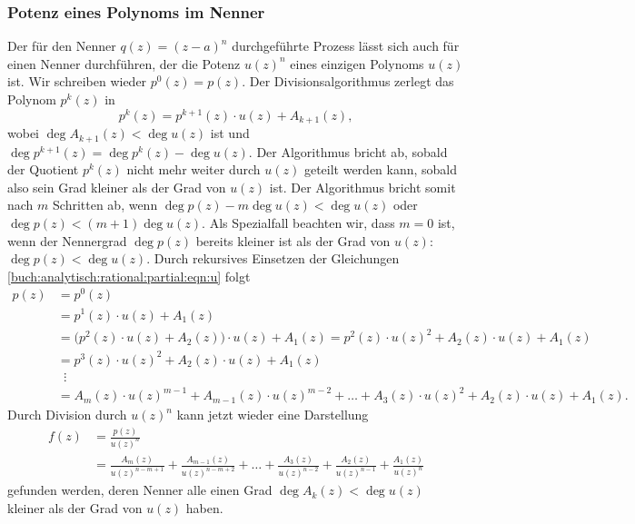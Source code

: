 %
%
\subsubsection{Potenz eines Polynoms im Nenner}
Der für den Nenner $q(z) = (z-a)^n$ durchgeführte Prozess lässt sich
auch für einen Nenner durchführen, der die Potenz $u(z)^n$ eines
einzigen Polynoms $u(z)$ ist.
Wir schreiben wieder $p^0(z)=p(z)$.
Der Divisionsalgorithmus zerlegt das Polynom $p^k(z)$ in 
\begin{equation}
p^k(z)
=
p^{k+1}(z)\cdot u(z) + A_{k+1}(z),
\label{buch:analytisch:rational:partial:eqn:u}
\end{equation}
wobei $\deg A_{k+1}(z)<\deg u(z)$ ist und
$\deg p^{k+1}(z) = \deg p^{k}(z)-\deg u(z)$.
Der Algorithmus bricht ab, sobald der Quotient $p^k(z)$ nicht
mehr weiter durch $u(z)$ geteilt werden kann, sobald also
sein Grad kleiner als der Grad von $u(z)$ ist.
Der Algorithmus bricht somit nach $m$ Schritten ab, wenn
$\deg p(z) - m\deg u(z) < \deg u(z)$ oder
$\deg p(z) < (m+1) \deg u(z)$.
Als Spezialfall beachten wir, dass $m=0$ ist, wenn der Nennergrad
$\deg p(z)$ bereits kleiner ist als der Grad von
$u(z)$: $\deg p(z) < \deg u(z)$.
Durch rekursives Einsetzen der Gleichungen
\eqref{buch:analytisch:rational:partial:eqn:u}
folgt
\begin{align*}
p(z)
&=
p^0(z)
\\
&=
p^1(z)\cdot u(z) + A_1(z)
\\
&=
\bigl(
p^2(z)\cdot u(z) + A_2(z)
\bigr)\cdot u(z) + A_1(z)
=
p^2(z)\cdot u(z)^2 + A_2(z) \cdot u(z) + A_1(z)
\\
&=
p^3(z)\cdot u(z)^2 + A_2(z)\cdot u(z) + A_1(z)
\\[-2pt]
&\phantom{a}\vdots
\\
&=
A_m(z)\cdot u(z)^{m-1} + A_{m-1}(z)\cdot u(z)^{m-2}
+
\ldots
+
A_3(z)\cdot u(z)^2 + A_2(z)\cdot u(z) + A_1(z).
\end{align*}
Durch Division durch $u(z)^n$ kann jetzt wieder eine Darstellung
\begin{align*}
f(z)
&=
\frac{p(z)}{u(z)^n}
\\
&=
\frac{A_m(z)}{u(z)^{n-m+1}}
+
\frac{A_{m-1}(z)}{u(z)^{n-m+2}}
+
\ldots
+
\frac{A_3(z)}{u(z)^{n-2}}
+
\frac{A_2(z)}{u(z)^{n-1}}
+
\frac{A_1(z)}{u(z)^n}
\end{align*}
gefunden werden, deren Nenner alle einen Grad $\deg A_k(z)<\deg u(z)$ 
kleiner als der Grad von $u(z)$ haben.

%
%
